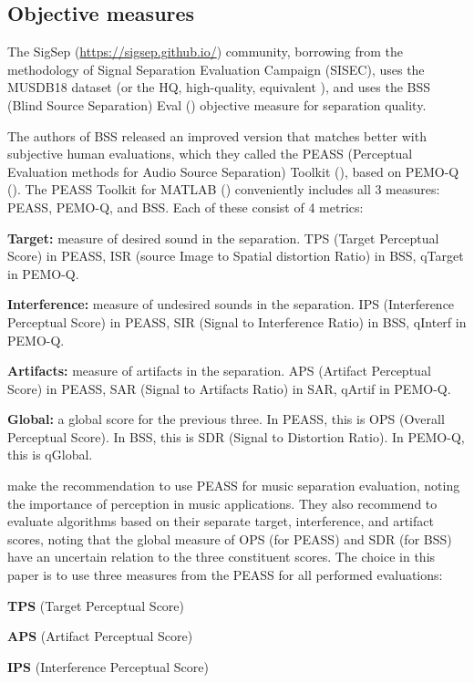 \documentclass[10pt,letter]{article}
\newenvironment{tight_enumerate}{
\begin{enumerate}
\setlength{\itemsep}{0pt}
\setlength{\parskip}{0pt}
}{\end{enumerate}}
\newenvironment{tight_itemize}{
\begin{itemize}
\setlength{\itemsep}{0pt}
\setlength{\parskip}{0pt}
}{\end{itemize}}
\begin{document}
\subsection{Objective measures}

The SigSep (\href{https://sigsep.github.io/}{https://sigsep.github.io/}) community, borrowing from the methodology of Signal Separation Evaluation Campaign (SISEC), uses the MUSDB18 dataset \cite{musdb18} (or the HQ, high-quality, equivalent \cite{musdb18-hq}), and uses the BSS (Blind Source Separation) Eval (\cite{bss}) objective measure for separation quality.

The authors of BSS released an improved version that matches better with subjective human evaluations, which they called the PEASS (Perceptual Evaluation methods for Audio Source Separation) Toolkit (\cite{peass}), based on PEMO-Q (\cite{pemoq}). The PEASS Toolkit for MATLAB (\cite{peassmatlab}) conveniently includes all 3 measures: PEASS, PEMO-Q, and BSS. Each of these consist of 4 metrics:

\begin{tight_itemize}
\vspace{-0.5em}
\item
	\textbf{Target:} measure of desired sound in the separation. TPS (Target Perceptual Score) in PEASS, ISR (source Image to Spatial distortion Ratio) in BSS, qTarget in PEMO-Q.
\item
	\textbf{Interference:} measure of undesired sounds in the separation. IPS (Interference Perceptual Score) in PEASS, SIR (Signal to Interference Ratio) in BSS, qInterf in PEMO-Q.
\item
	\textbf{Artifacts:} measure of artifacts in the separation. APS (Artifact Perceptual Score) in PEASS, SAR (Signal to Artifacts Ratio) in SAR, qArtif in PEMO-Q.
\item
	\textbf{Global:} a global score for the previous three. In PEASS, this is OPS (Overall Perceptual Score). In BSS, this is SDR (Signal to Distortion Ratio). In PEMO-Q, this is qGlobal.
\end{tight_itemize}

\citet{beassvpeass} make the recommendation to use PEASS for music separation evaluation, noting the importance of perception in music applications. They also recommend to evaluate algorithms based on their separate target, interference, and artifact scores, noting that the global measure of OPS (for PEASS) and SDR (for BSS) have an uncertain relation to the three constituent scores. The choice in this paper is to use three measures from the PEASS for all performed evaluations:
\begin{tight_enumerate}
	\vspace{-0.5em}
	\item
		\textbf{TPS} (Target Perceptual Score)
	\item
		\textbf{APS} (Artifact Perceptual Score)
	\item
		\textbf{IPS} (Interference Perceptual Score)
\end{tight_enumerate}
\end{document}
